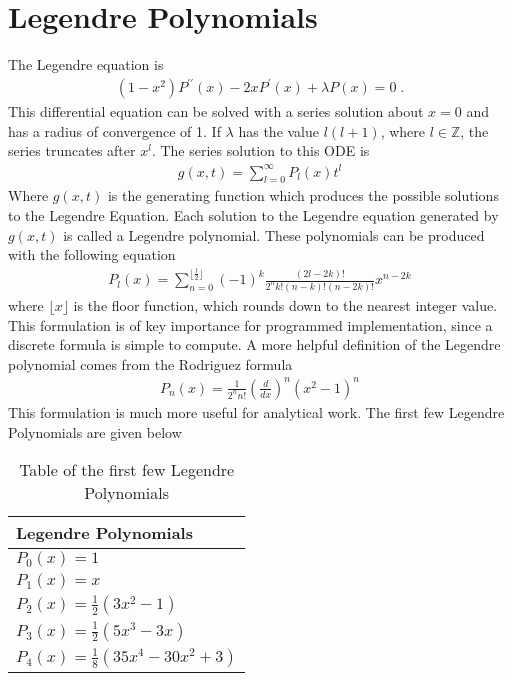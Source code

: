     \section{Legendre Polynomials} \label{sec:Legendre_Polynomial}
        The Legendre equation is 
        \begin{align}
            (1 - x^2)P^{\prime \prime}(x) -2xP^\prime(x) + \lambda P(x) = 0\;.
        \end{align}
        \noindent This differential equation can be solved with a series solution about $x = 0$ and has a radius of convergence of 1. If $\lambda$ has the value $l(l+1)$, where $l \in \mathbb{Z}$, the series truncates after $x^{l}$. The series solution to this ODE is 
        \begin{align}
            g(x, t) = \sum_{l = 0}^\infty P_l(x) t^l 
        \end{align}
        \noindent Where $g(x, t)$ is the generating function which produces the possible solutions to the Legendre Equation. Each solution to the Legendre equation generated by $g(x, t)$ is called a Legendre polynomial. These polynomials can be produced with the following equation
        \begin{align}
            P_l(x) = \sum_{n = 0}^{\lfloor \frac{l}{2} \rfloor} (-1)^k \frac{(2l - 2k)!}{2^n k! (n - k)!(n - 2k)!}x^{n-2k}
        \end{align}
        \noindent where $\lfloor x \rfloor$ is the floor function, which rounds down to the nearest integer value. This formulation is of key importance for programmed implementation, since a discrete formula is simple to compute. A more helpful definition of the Legendre polynomial comes from the Rodriguez formula \cite{Arfken_Weber_Arfken_Weber_2008}
        \begin{align}
            P_n(x) = \frac{1}{2^n n!} \left( \frac{d}{dx} \right)^n (x^2 - 1)^n
        \end{align}
        \noindent This formulation is much more useful for analytical work. The first few Legendre Polynomials are given below
        \begin{table}
            \centering
            \begin{tabular}{l}
                Legendre Polynomials\\
                \hline
                $P_0(x) = 1$\\
                $P_1(x) = x$\\
                $P_2(x) = \frac{1}{2}\left(3x^2 - 1\right)$\\
                $P_3(x) = \frac{1}{2} \left(5x^3 - 3x\right)$ \\
                $P_4(x) = \frac{1}{8} \left(35x^4 - 30x^2 + 3 \right)$\\
                \hline
            \end{tabular}
            \caption{Table of the first few Legendre Polynomials}
            \label{tab:Legendre_Polynomials}
        \end{table}
